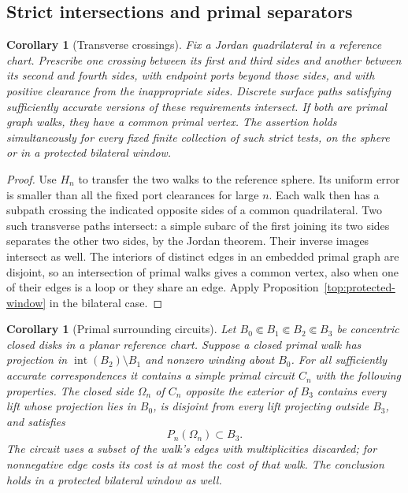 \documentclass[11pt]{article}
\numberwithin{equation}{section}
\newtheorem{corollary}[theorem]{Corollary}
\theoremstyle{definition}
\theoremstyle{remark}
\newcommand{\1}{\mathbf 1}
\begin{document}
\subsection{Strict intersections and primal separators}

\begin{corollary}[Transverse crossings]\label{top:transverse}
Fix a Jordan quadrilateral in a reference chart.  Prescribe one
crossing between its first and third sides and another between its
second and fourth sides, with endpoint ports beyond those sides,
and with positive clearance from the inappropriate sides.  Discrete
surface paths satisfying sufficiently accurate versions of these
requirements intersect.  If both are primal graph walks, they
have a common primal vertex.  The assertion holds simultaneously
for every fixed finite collection of such strict tests, on the
sphere or in a protected bilateral window.
\end{corollary}

\begin{proof}
Use $H_n$ to transfer the two walks to the reference sphere.  Its
uniform error is smaller than all the fixed port clearances for
large $n$.  Each walk then has a subpath crossing the indicated
opposite sides of a common quadrilateral.  Two such transverse
paths intersect: a simple subarc of the first joining its two
sides separates the other two sides, by the Jordan theorem.
Their inverse images intersect as well.  The interiors of
distinct edges in an embedded primal graph are disjoint, so an
intersection of primal walks gives a common vertex, also when
one of their edges is a loop or they share an edge.  Apply
Proposition~\ref{top:protected-window} in the bilateral case.
\end{proof}

\begin{corollary}[Primal surrounding circuits]\label{top:circuits}
Let $B_0\Subset B_1\Subset B_2\Subset B_3$ be concentric closed
disks in a planar reference chart.  Suppose a closed primal walk
has projection in $\operatorname{int}(B_2)\setminus B_1$ and
nonzero winding about $B_0$.  For all sufficiently accurate
correspondences it contains a simple primal circuit $C_n$ with
the following properties.  The closed side $\Omega_n$ of $C_n$
opposite the exterior of $B_3$ contains every lift whose projection
lies in $B_0$, is disjoint from every lift projecting outside $B_3$,
and satisfies
\[
 P_n(\Omega_n)\subset B_3.
\]
The circuit uses a subset of the walk's edges with multiplicities
discarded; for nonnegative edge costs its cost is at most the
cost of that walk.  The conclusion holds in a protected bilateral
window as well.
\end{corollary}
\end{document}
